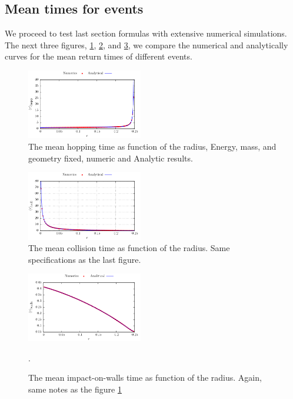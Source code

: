 \documentclass[letterpaper,10pt, jcp, aps]{revtex4-1}
\begin{document}
\subsection{Mean times for events}

We proceed to test last section formulas with
extensive numerical simulations.
The next three figures, \ref{MeanHopp01}, \ref{MeanCol01}, and \ref{MeanImp01},  
we compare the
numerical and analytically curves for the mean return times of different events.

\begin{figure}[h]
  \centering
  \includegraphics[width=0.45\textwidth]{./FigurasPerfectas/HopTimes02.pdf}
  \caption{The mean hopping time as function of the radius, Energy, mass, 
and geometry fixed, numeric and Analytic results.}\label{MeanHopp01}
\end{figure}

\begin{figure}[h]
  \centering
  \includegraphics[width=0.45\textwidth]{./FigurasPerfectas/CollitionTimes02.pdf}
  \caption{The mean collision time as function of the radius. Same
    specifications as the last figure. }\label{MeanCol01}
\end{figure}


\begin{figure}[h]
  \centering
  \includegraphics[width=0.45\textwidth]{./FigurasPerfectas/ImpactWall02.pdf}
  \caption{The mean impact-on-walls time as function of the radius. Again, same
    notes as the figure \ref{MeanHopp01}}\label{MeanImp01}.
\end{figure}
\end{document}
